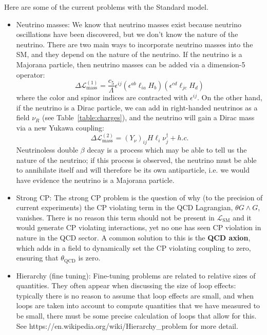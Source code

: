 \documentclass[11pt, oneside]{article}   	%
\theoremstyle{definition}
\begin{document}
Here are some of the current problems with the Standard model. 
\begin{itemize}
	\item Neutrino masses: We know that neutrino masses exist because neutrino oscillations have been discovered, but we don't know 
	the nature of the neutrino. There are two main ways to incorporate neutrino masses into the SM, and they depend on the nature of the 
	neutrino. If the neutrino is a Majorana particle, then neutrino masses can be added via a dimension-5 operator:
	\begin{equation}
		\Delta\mathcal L^{(1)}_\mathrm{mass} = \frac{c_5}{\Lambda} \epsilon^{ij}(\epsilon^{ab} \ell_{ia} H_b) (\epsilon^{cd} \ell_{jc} H_d)
	\end{equation}
	where the color and spinor indices are contracted with $\epsilon^{ij}$. On the other hand, if the neutrino is a Dirac particle, we can 
	add in right-handed neutrinos as a field $\nu_R$ (see Table~\ref{table:charges}), and the neutrino will gain a Dirac mass via a new 
	Yukawa coupling:
	\begin{equation}
		\Delta\mathcal L^{(2)}_\mathrm{mass} = (Y_\nu)_{ij} H\ell_i \nu_j^\dagger + h.c. 
	\end{equation}
	Neutrinoless double $\beta$ decay is a process which may be able to tell us the nature of the neutrino; if this process is observed, 
	the neutrino must be able to annihilate itself and will therefore be its own antiparticle, i.e. we would have evidence the neutrino is 
	a Majorana particle. 
	\item Strong CP: The strong CP problem is the question of why (to the precision of current experiments) the CP violating term 
	in the QCD Lagrangian, $\theta G\wedge G$, vanishes. There is no reason this term should not be present in 
	$\mathcal L_\mathrm{SM}$ and it would generate CP violating interactions, yet no one has seen CP violation in nature in the QCD 
	sector. A common solution to this is the \textbf{QCD axion}, which adds in a field to dynamically set the CP violating coupling to zero, 
	ensuring that $\theta_\mathrm{QCD}$ is zero. 
	\item Hierarchy (fine tuning): Fine-tuning problems are related to relative sizes of quantities. They often appear when discussing the 
	size of loop effects: typically there is no reason to assume that loop effects are small, and when loops are taken into account to 
	compute quantities that we have measured to be small, there must be some precise calculation of loops that allow for this. 
	See https://en.wikipedia.org/wiki/Hierarchy\_problem for more detail.
\end{itemize}
\end{document}
